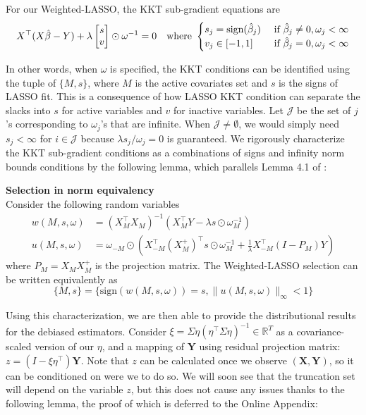 \documentclass[11pt]{article}
\newcommand{\q}{\text{\quad}}
\newcommand{\wh}{\text{where }}
\newcommand{\sgn}{\textrm{sign}}
\newcommand{\RR}{\mathbb{R}}
\begin{document}
For our Weighted-LASSO, the KKT sub-gradient equations are 
\begin{equation}
	X^\top (X\hat{\beta}-Y)+\lambda\begin{bmatrix}s\\v\end{bmatrix}\odot\omega^{-1}=0\q \wh 
	\begin{cases}
		{s_j}=\sgn(\hat{\beta}_j)&\text{ if }\hat{\beta}_j\neq 0,\omega_j<\infty\\
		v_j\in[-1,1]&\text{ if }\hat{\beta}_j=0,\omega_j<\infty
	\end{cases}
\end{equation}

In other words, when $\omega$ is specified, the KKT conditions can be identified using the tuple of $\{M,s\}$, where $M$ is the active covariates set and $s$ is the signs of LASSO fit. This is a consequence of how LASSO KKT condition can separate the slacks into $s$ for active variables and $v$ for inactive variables. Let $\mathcal{J}$ be the set of $j$'s corresponding to $\omega_j$'s that are infinite. When $\mathcal{J}\neq \emptyset$, we would simply need $s_j<\infty$ for $i\in\mathcal{J}$ because $\lambda{s}_j/\omega_j=0$ is guaranteed. We rigorously characterize the KKT sub-gradient conditions as a combinations of signs and infinity norm bounds conditions by the following lemma, which parallels Lemma 4.1 of \cite{lee2016exact}:

\begin{lemma_app}\label{lem2}
	{\bf Selection in norm equivalency}\\
	Consider the following random variables
	\begin{equation}
		\begin{split}
			w(M,s,\omega)&=(X_M^\top X_M)^{-1}(X_M^\top Y-\lambda s\odot\omega^{-1}_M)\\
			u(M,s,\omega)&=\omega_{-M}\odot
			\left(
			X_{-M}^\top(X_M^+)^\top s\odot\omega^{-1}_M
			+\frac{1}{\lambda}X_{-M}^\top (I-P_M)Y\right)
		\end{split}
	\end{equation}
	where $P_M=X_MX_M^+$ is the projection matrix. The Weighted-LASSO selection can be written equivalently as
	\begin{equation}
		\{M,s\}=\{\sgn(w(M,s,\omega))=s,\|u(M,s,\omega)\|_\infty<1 \}
	\end{equation}
\end{lemma_app}


Using this characterization, we are then able to provide the distributional results for the debiased estimators. Consider $\xi=\Sigma\eta(\eta^\top \Sigma\eta)^{-1}\in\RR^{T}$ as a covariance-scaled version of our $\eta$, and a mapping of $\bm{Y}$ using residual projection matrix: $ z=(I-\xi\eta^\top )\bm{Y}$. Note that $z$ can be calculated once we observe $(\bm{X},\bm{Y})$, so it can be conditioned on were we to do so. We will soon see that the truncation set will depend on the variable $z$, but this does not cause any issues thanks to the following lemma, the proof of which is deferred to the Online Appendix:
\end{document}
